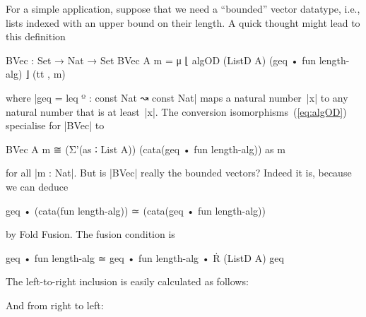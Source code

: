 For a simple application, suppose that we need a ``bounded'' vector datatype, i.e., lists indexed with an upper bound on their length.
A quick thought might lead to this definition
\begin{code}
BVec : Set → Nat → Set
BVec A m = μ ⌊ algOD (ListD A) (geq • fun length-alg) ⌋ (tt , m)
\end{code}
where |geq = leq º : const Nat ↝ const Nat| maps a natural number~|x| to any natural number that is at least~|x|.
The conversion isomorphisms~(\ref{eq:algOD}) specialise for |BVec| to
\begin{code}
BVec A m ≅ (Σ'(as ∶ List A)) (cata(geq • fun length-alg)) as m
\end{code}
for all |m : Nat|.
But is |BVec| really the bounded vectors?
Indeed it is, because we can deduce
\begin{code}
geq • (cata(fun length-alg)) ≃ (cata(geq • fun length-alg))
\end{code}
by Fold Fusion.
The fusion condition is
\begin{code}
geq • fun length-alg ≃ geq • fun length-alg • Ṙ (ListD A) geq
\end{code}
The left-to-right inclusion is easily calculated as follows:
And from right to left:
